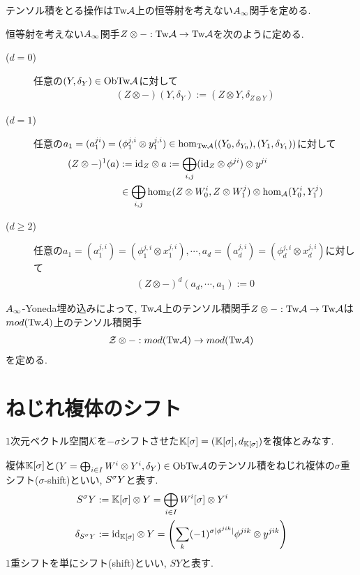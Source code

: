 \documentclass[uplatex, a4paper, 14Q, dvipdfmx]{jsarticle}
\begin{document}
テンソル積をとる操作は$\Tw\A$上の恒等射を考えない$A_{\infty}$関手を定める.

\begin{definition}[$\Tw\A$上のテンソル積関手]
  恒等射を考えない$A_{\infty}$関手$Z \otimes - : \mathrm{Tw}\mathcal{A} \to \mathrm{Tw}\mathcal{A}$を次のように定める.
  \begin{description}
    \item[($d=0$)] 任意の$(Y,\delta_Y) \in \mathrm{Ob}\mathrm{Tw}\mathcal{A}$に対して
    \begin{align*}
      (Z \otimes -)(Y,\delta_Y) 
      := (Z \otimes Y, \delta_{Z \otimes Y})
    \end{align*}
    \item[($d=1$)] 任意の$a_1 = (a_1^{ji}) = (\phi_1^{j,i} \otimes y_1^{j,i}) \in \hom_{\mathrm{Tw}\mathcal{A}}((Y_0,\delta_{Y_0}),(Y_1,\delta_{Y_1}))$に対して
    \begin{align*}
      (Z \otimes -)^1(a) 
      &:= \mathrm{id}_Z \otimes a 
      := \bigoplus_{i,j} (\mathrm{id}_Z \otimes \phi^{ji}) \otimes y^{ji} \\
      &\in \bigoplus_{i,j} \hom_{\mathbb{K}}(Z \otimes W_0^i, Z \otimes W_1^j) \otimes \hom_{\mathcal{A}}(Y_0^i,Y_1^j)
    \end{align*}
    \item[($d \geq 2$)] 任意の$a_1 = (a_1^{j,i}) = (\phi_1^{j,i} \otimes x_1^{j,i}), \cdots, a_d = (a_d^{j,i}) = (\phi_d^{j,i} \otimes x_d^{j,i})$に対して
    \begin{align*}
      (Z \otimes -)^d(a_d,\cdots,a_1)
      := 0
    \end{align*}
  \end{description}
\end{definition}

\begin{remark}
  $A_{\infty}$-Yoneda埋め込みによって, $\Tw\A$上のテンソル積関手$Z \otimes - : \mathrm{Tw}\mathcal{A} \to \mathrm{Tw}\mathcal{A}$は$mod (\mathrm{Tw}\mathcal{A})$上のテンソル積関手
  \begin{align*}
    \mathcal{Z} \otimes - : mod (\mathrm{Tw}\mathcal{A}) \to mod (\mathrm{Tw}\mathcal{A})
  \end{align*}
  を定める.
\end{remark}

\section{ねじれ複体のシフト}

$1$次元ベクトル空間$\mathcal{K}$を$-\sigma$シフトさせた$\mathbb{K}[\sigma] = (\mathbb{K}[\sigma],d_{\mathbb{K}[\sigma]})$を複体とみなす. 

\begin{definition}[ねじれ複体のシフト]
  複体$\mathbb{K}[\sigma]$と$(Y = \bigoplus_{i \in I} W^i \otimes Y^i, \delta_Y) \in \mathrm{Ob}\mathrm{Tw}\mathcal{A}$のテンソル積をねじれ複体の$\sigma$重シフト($\sigma$-shift)といい, $S^\sigma Y$と表す.
  \begin{align*}
    S^\sigma Y 
    &:= \mathbb{K}[\sigma] \otimes Y 
    = \bigoplus_{i \in I} W^i[\sigma] \otimes Y^i \\
    \delta_{S^\sigma Y}
    &:= \mathrm{id}_{\mathbb{K}[\sigma]} \otimes Y 
    = \qty(\sum_{k} (-1)^{\sigma |\phi^{jik}|} \phi^{jik} \otimes y^{jik})
  \end{align*}
  $1$重シフトを単にシフト(shift)といい, $SY$と表す.
\end{definition}
\end{document}
